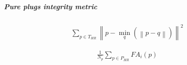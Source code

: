 \subparagraph{Pure plugs integrity metric}

\begin{equation}
\label{eq:minDist}
\begin{gathered}
\sum_{p\in T_{HR}} \left \| p - \min_{q}(\left \| p-q \right \|) \right \|^2
\end{gathered}
\end{equation}


\begin{equation}
\label{eq:minDist}
\begin{gathered}
\frac{1}{N_p}\sum_{p\in P_{HR}} FA_i(p)
\end{gathered}
\end{equation}








